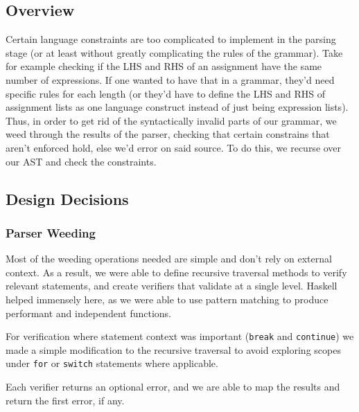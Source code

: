 \documentclass[11pt]{article}
\begin{document}
\subsection{Overview}
Certain language constraints are too complicated to implement in the
parsing stage (or at least without greatly complicating the rules of
the grammar). Take for example checking if the LHS and RHS of an
assignment have the same number of expressions. If one wanted to have
that in a grammar, they'd need specific rules for each length (or
they'd have to define the LHS and RHS of assignment lists as one
language construct instead of just being expression lists). Thus, in
order to get rid of the syntactically invalid parts of our grammar, we
weed through the results of the parser, checking that certain
constrains that aren't enforced hold, else we'd error on said
source. To do this, we recurse over our AST and check the constraints.
\subsection{Design Decisions}
\subsubsection{Parser Weeding}
Most of the weeding operations needed are simple and don't rely on
external context. As a result, we were able to define recursive
traversal methods to verify relevant statements, and create verifiers
that validate at a single level. Haskell helped immensely here, as we
were able to use pattern matching to produce performant and
independent functions.

For verification where statement context was important (\texttt{break}
and \texttt{continue}) we made a simple modification to the recursive
traversal to avoid exploring scopes under \texttt{for} or
\texttt{switch} statements where applicable.

Each verifier returns an optional error, and we are able to map the
results and return the first error, if any.
\end{document}
